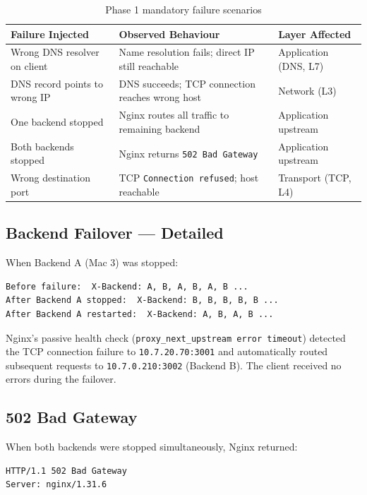 \documentclass[12pt,a4paper]{article}
\begin{document}
\begin{table}[h!]
\centering
\caption{Phase 1 mandatory failure scenarios}
\begin{tabular}{p{4cm}p{4.5cm}p{4cm}}
\toprule
\textbf{Failure Injected} & \textbf{Observed Behaviour} & \textbf{Layer Affected} \\
\midrule
Wrong DNS resolver on client & Name resolution fails; direct IP still reachable & Application (DNS, L7) \\
DNS record points to wrong IP & DNS succeeds; TCP connection reaches wrong host & Network (L3) \\
One backend stopped & Nginx routes all traffic to remaining backend & Application upstream \\
Both backends stopped & Nginx returns \texttt{502 Bad Gateway} & Application upstream \\
Wrong destination port & TCP \texttt{Connection refused}; host reachable & Transport (TCP, L4) \\
\bottomrule
\end{tabular}
\end{table}

\subsection{Backend Failover --- Detailed}

When Backend A (Mac 3) was stopped:

\begin{lstlisting}
Before failure:  X-Backend: A, B, A, B, A, B ...
After Backend A stopped:  X-Backend: B, B, B, B, B ...
After Backend A restarted:  X-Backend: A, B, A, B ...
\end{lstlisting}

Nginx's passive health check (\texttt{proxy\_next\_upstream error timeout}) detected the TCP connection failure to \texttt{10.7.20.70:3001} and automatically routed subsequent requests to \texttt{10.7.0.210:3002} (Backend B). The client received no errors during the failover.

\subsection{502 Bad Gateway}

When both backends were stopped simultaneously, Nginx returned:

\begin{lstlisting}
HTTP/1.1 502 Bad Gateway
Server: nginx/1.31.6
\end{lstlisting}
\end{document}
